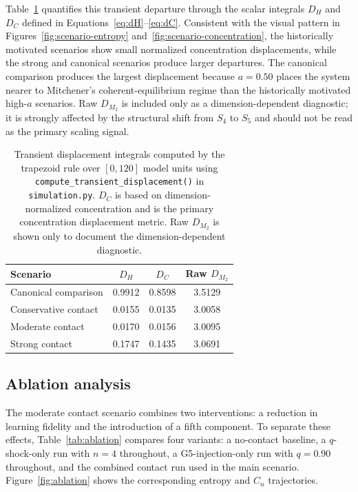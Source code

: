 \documentclass[11pt]{article}
\begin{document}
Table~\ref{tab:displacement-integrals} quantifies this transient departure through the scalar integrals $D_H$ and $D_C$ defined in Equations~\eqref{eq:dH}--\eqref{eq:dC}. Consistent with the visual pattern in Figures~\ref{fig:scenario-entropy} and~\ref{fig:scenario-concentration}, the historically motivated scenarios show small normalized concentration displacements, while the strong and canonical scenarios produce larger departures. The canonical comparison produces the largest displacement because $a=0.50$ places the system nearer to Mitchener's coherent-equilibrium regime than the historically motivated high-$a$ scenarios. Raw $D_{M_2}$ is included only as a dimension-dependent diagnostic; it is strongly affected by the structural shift from $S_4$ to $S_5$ and should not be read as the primary scaling signal.

\begin{table}[h]
\centering
\caption{Transient displacement integrals computed by the trapezoid rule over $[0,120]$ model units using \texttt{compute\_transient\_displacement()} in \texttt{simulation.py}. $D_C$ is based on dimension-normalized concentration and is the primary concentration displacement metric. Raw $D_{M_2}$ is shown only to document the dimension-dependent diagnostic.}
\label{tab:displacement-integrals}
\small
\begin{tabular}{lccc}
\toprule
Scenario & $D_H$ & $D_C$ & Raw $D_{M_2}$ \\
\midrule
Canonical comparison  & 0.9912 & 0.8598 & 3.5129 \\
Conservative contact  & 0.0155 & 0.0135 & 3.0058 \\
Moderate contact      & 0.0170 & 0.0156 & 3.0095 \\
Strong contact        & 0.1747 & 0.1435 & 3.0691 \\
\bottomrule
\end{tabular}
\end{table}

\subsection{Ablation analysis}

The moderate contact scenario combines two interventions: a reduction in learning fidelity and the introduction of a fifth component. To separate these effects, Table~\ref{tab:ablation} compares four variants: a no-contact baseline, a $q$-shock-only run with $n=4$ throughout, a G5-injection-only run with $q=0.90$ throughout, and the combined contact run used in the main scenario. Figure~\ref{fig:ablation} shows the corresponding entropy and $C_n$ trajectories.
\end{document}
